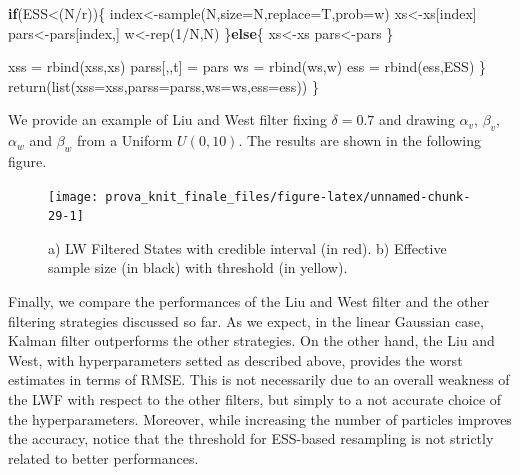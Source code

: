 \documentclass[
]{book}
\newenvironment{Shaded}{\begin{snugshade}}{\end{snugshade}}
\newcommand{\AttributeTok}[1]{\textcolor[rgb]{0.77,0.63,0.00}{#1}}
\newcommand{\ControlFlowTok}[1]{\textcolor[rgb]{0.13,0.29,0.53}{\textbf{#1}}}
\newcommand{\DecValTok}[1]{\textcolor[rgb]{0.00,0.00,0.81}{#1}}
\newcommand{\FunctionTok}[1]{\textcolor[rgb]{0.00,0.00,0.00}{#1}}
\newcommand{\NormalTok}[1]{#1}
\newcommand{\OtherTok}[1]{\textcolor[rgb]{0.56,0.35,0.01}{#1}}
\newcommand{\SpecialCharTok}[1]{\textcolor[rgb]{0.00,0.00,0.00}{#1}}
\theoremstyle{break}
\theoremstyle{nonumberplain}
\begin{document}
\begin{Shaded}
\begin{Highlighting}[]
    \ControlFlowTok{if}\NormalTok{(ESS}\SpecialCharTok{\textless{}}\NormalTok{(N}\SpecialCharTok{/}\NormalTok{r))\{}
\NormalTok{      index}\OtherTok{\textless{}{-}}\FunctionTok{sample}\NormalTok{(N,}\AttributeTok{size=}\NormalTok{N,}\AttributeTok{replace=}\NormalTok{T,}\AttributeTok{prob=}\NormalTok{w)}
\NormalTok{      xs}\OtherTok{\textless{}{-}}\NormalTok{xs[index]}
\NormalTok{      pars}\OtherTok{\textless{}{-}}\NormalTok{pars[index,]}
\NormalTok{      w}\OtherTok{\textless{}{-}}\FunctionTok{rep}\NormalTok{(}\DecValTok{1}\SpecialCharTok{/}\NormalTok{N,N)}
\NormalTok{    \}}\ControlFlowTok{else}\NormalTok{\{}
\NormalTok{      xs}\OtherTok{\textless{}{-}}\NormalTok{xs}
\NormalTok{      pars}\OtherTok{\textless{}{-}}\NormalTok{pars}
\NormalTok{    \}}
    
    
\NormalTok{    xss         }\OtherTok{=} \FunctionTok{rbind}\NormalTok{(xss,xs)}
\NormalTok{    parss[,,t]  }\OtherTok{=}\NormalTok{ pars }
\NormalTok{    ws          }\OtherTok{=} \FunctionTok{rbind}\NormalTok{(ws,w)}
\NormalTok{    ess         }\OtherTok{=} \FunctionTok{rbind}\NormalTok{(ess,ESS)}
\NormalTok{  \}}
  \FunctionTok{return}\NormalTok{(}\FunctionTok{list}\NormalTok{(}\AttributeTok{xss=}\NormalTok{xss,}\AttributeTok{parss=}\NormalTok{parss,}\AttributeTok{ws=}\NormalTok{ws,}\AttributeTok{ess=}\NormalTok{ess))}
\NormalTok{\}}
\end{Highlighting}
\end{Shaded}

We provide an example of Liu and West filter fixing \(\delta=0.7\) and
drawing \(\alpha_{v}\), \(\beta_{v}\), \(\alpha_{w}\) and \(\beta_{w}\)
from a Uniform \(U(0,10)\). The results are shown in the following
figure.

\begin{figure}[H]

{\centering \texttt{[image: prova\_knit\_finale\_files/figure-latex/unnamed-chunk-29-1]} 

}

\caption{a) LW Filtered States with credible interval (in red). b) Effective sample size (in black) with threshold (in yellow).}\label{fig:unnamed-chunk-29}
\end{figure}

Finally, we compare the performances of the Liu and West filter and the
other filtering strategies discussed so far. As we expect, in the linear
Gaussian case, Kalman filter outperforms the other strategies. On the
other hand, the Liu and West, with hyperparameters setted as described
above, provides the worst estimates in terms of RMSE. This is not
necessarily due to an overall weakness of the LWF with respect to the
other filters, but simply to a not accurate choice of the
hyperparameters. Moreover, while increasing the number of particles
improves the accuracy, notice that the threshold for ESS-based
resampling is not strictly related to better performances.
\end{document}
